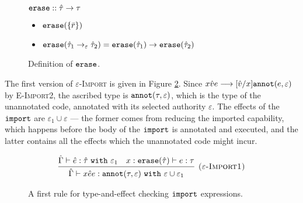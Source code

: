 \begin{figure}[h]
\vspace{-5pt}

$\mathtt{erase} :: \hat \tau \rightarrow \tau$
\begin{itemize}
	\setlength\itemsep{-0.2em}
	\item[] $\mathtt{erase}(\{ \bar r \})$
	\item[] $\mathtt{erase}(\hat \tau_1 \rightarrow_{\varepsilon} \hat \tau_2) = \mathtt{erase}(\hat \tau_1) \rightarrow \mathtt{erase}(\hat \tau_2)$
\end{itemize}

\vspace{-7pt}
\caption{Definition of $\mathtt{erase}$.}
\label{fig:erase_defn}
\end{figure}

The first version of \textsc{$\varepsilon$-Import} is given in Figure \ref{fig:import_rule_1}. Since ${x}{\hat v}{e} \longrightarrow [\hat v/x]\mathtt{annot}(e, \varepsilon)$ by \textsc{E-Import2}, the ascribed type is $\mathtt{annot}(\tau, \varepsilon)$, which is the type of the unannotated code, annotated with its selected authority $\varepsilon$. The effects of the $\mathtt{import}$ are $\varepsilon_1 \cup \varepsilon$ --- the former comes from reducing the imported capability, which happens before the body of the $\mathtt{import}$ is annotated and executed, and the latter contains all the effects which the unannotated code might incur.


\begin{figure}[h]

\[
\begin{array}{c}

\infer[\textsc{($\varepsilon$-Import1)}]
	{ \hat \Gamma \vdash {x}{\hat e}{e}: \kwa{annot}(\tau, \varepsilon)~\kw{with} \varepsilon \cup \varepsilon_1 }
	{ \hat \Gamma \vdash \hat e: \hat \tau~\kw{with} \varepsilon_1 & x: \kwa{erase}(\hat \tau) \vdash e: \tau }

\end{array}
\]
\vspace{-7pt}
\caption{A first rule for type-and-effect checking $\mathtt{import}$ expressions.}
\label{fig:import_rule_1}
\end{figure}

